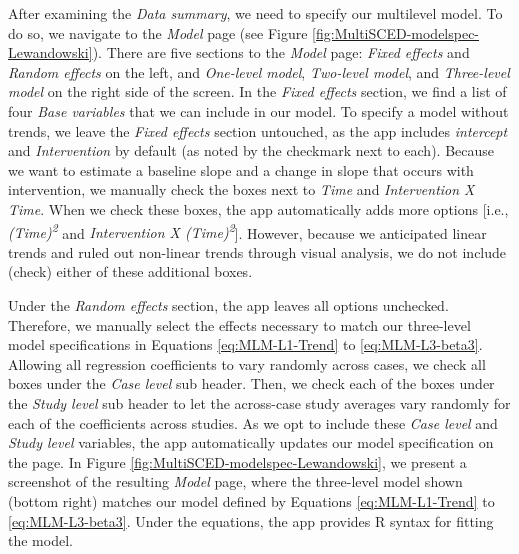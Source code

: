 \documentclass[
]{book}
\begin{document}
After examining the \emph{Data summary}, we need to specify our multilevel model. To do so, we navigate to the \emph{Model} page (see Figure \ref{fig:MultiSCED-modelspec-Lewandowski}). There are five sections to the \emph{Model} page: \emph{Fixed effects} and \emph{Random effects} on the left, and \emph{One-level model}, \emph{Two-level model}, and \emph{Three-level model} on the right side of the screen. In the \emph{Fixed effects} section, we find a list of four \emph{Base variables} that we can include in our model. To specify a model without trends, we leave the \emph{Fixed effects} section untouched, as the app includes \emph{intercept} and \emph{Intervention} by default (as noted by the checkmark next to each). Because we want to estimate a baseline slope and a change in slope that occurs with intervention, we manually check the boxes next to \emph{Time} and \emph{Intervention X Time}. When we check these boxes, the app automatically adds more options {[}i.e., \emph{(Time)\textsuperscript{2}} and \emph{Intervention X (Time)\textsuperscript{2}}{]}. However, because we anticipated linear trends and ruled out non-linear trends through visual analysis, we do not include (check) either of these additional boxes.

Under the \emph{Random effects} section, the app leaves all options unchecked. Therefore, we manually select the effects necessary to match our three-level model specifications in Equations \eqref{eq:MLM-L1-Trend} to \eqref{eq:MLM-L3-beta3}. Allowing all regression coefficients to vary randomly across cases, we check all boxes under the \emph{Case level} sub header. Then, we check each of the boxes under the \emph{Study level} sub header to let the across-case study averages vary randomly for each of the coefficients across studies. As we opt to include these \emph{Case level} and \emph{Study level} variables, the app automatically updates our model specification on the page. In Figure \ref{fig:MultiSCED-modelspec-Lewandowski}, we present a screenshot of the resulting \emph{Model} page, where the three-level model shown (bottom right) matches our model defined by Equations \eqref{eq:MLM-L1-Trend} to \eqref{eq:MLM-L3-beta3}. Under the equations, the app provides R syntax for fitting the model.
\end{document}
